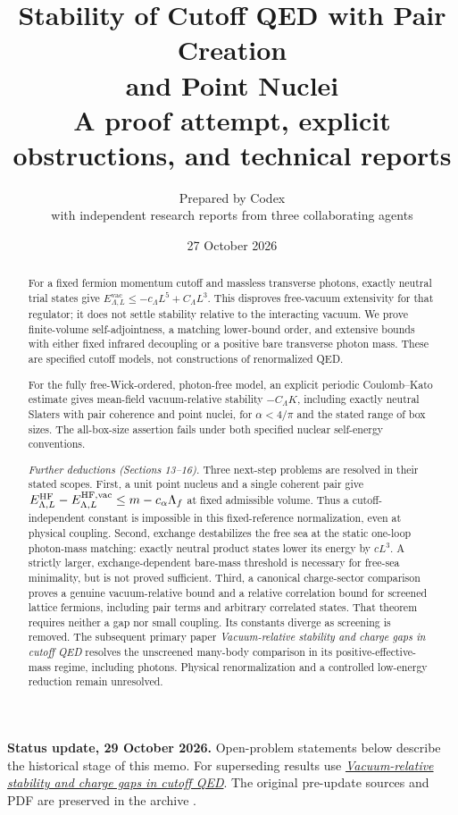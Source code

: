 \documentclass[11pt,letterpaper]{article}
\title{\textbf{Stability of Cutoff QED with Pair Creation\\and Point Nuclei}\\[0.5em]
\large A proof attempt, explicit obstructions, and technical reports}
\author{Prepared by Codex\\
\small with independent research reports from three collaborating agents}
\date{27 October 2026}
\numberwithin{equation}{section}
\theoremstyle{remark}
\newcommand{\vac}{\mathrm{vac}}
\begin{document}
\maketitle
\begin{abstract}
For a fixed fermion momentum cutoff and massless transverse photons,
exactly neutral trial states give
\(E^{\vac}_{\Lambda,L}\le-c_\Lambda L^5+C_\Lambda L^3\).
This disproves free-vacuum extensivity for that regulator; it does not
settle stability relative to the interacting vacuum. We prove finite-volume
self-adjointness, a matching lower-bound order, and extensive bounds with
either fixed infrared decoupling or a positive bare transverse photon mass.
These are specified cutoff models, not constructions of renormalized QED.

For the fully free-Wick-ordered, photon-free model, an explicit periodic
Coulomb--Kato estimate gives mean-field vacuum-relative stability
\(-C_\Lambda K\), including exactly neutral Slaters with pair coherence
and point nuclei, for \(\alpha<4/\pi\) and the stated range of box sizes.
The all-box-size assertion fails under both specified nuclear self-energy
conventions.

\smallskip\noindent\emph{Further deductions (Sections 13--16).}
Three next-step problems are resolved in their stated scopes.
First, a unit point nucleus and a single coherent pair give
\(E^{\rm HF}_{\Lambda,L}-E^{\rm HF,\vac}_{\Lambda,L}
\le m-c_\alpha\Lambda_f\) at fixed admissible volume.
Thus a cutoff-independent constant is impossible in this fixed-reference
normalization, even at physical coupling.
Second, exchange destabilizes the free sea at the static one-loop
photon-mass matching: exactly neutral product states lower its energy
by \(cL^3\). A strictly larger, exchange-dependent bare-mass threshold
is necessary for free-sea minimality, but is not proved sufficient.
Third, a canonical charge-sector comparison proves a genuine
vacuum-relative bound and a relative correlation bound for screened
lattice fermions, including pair terms and arbitrary correlated states.
That theorem requires neither a gap nor small coupling. Its constants
diverge as screening is removed. The subsequent primary paper
\emph{Vacuum-relative stability and charge gaps in cutoff QED} resolves the unscreened
many-body comparison in its positive-effective-mass regime, including
photons. Physical renormalization and a controlled low-energy reduction
remain unresolved.
\end{abstract}
\noindent\textbf{Status update, 29 October 2026.}
Open-problem statements below describe the historical stage of this memo.
For superseding results use
\href{run:../vacuum-relative-stability-paper/vacuum-relative-stability.pdf}
{\emph{Vacuum-relative stability and charge gaps in cutoff QED}}.
The original pre-update sources and PDF are preserved in the archive
.
\end{document}
